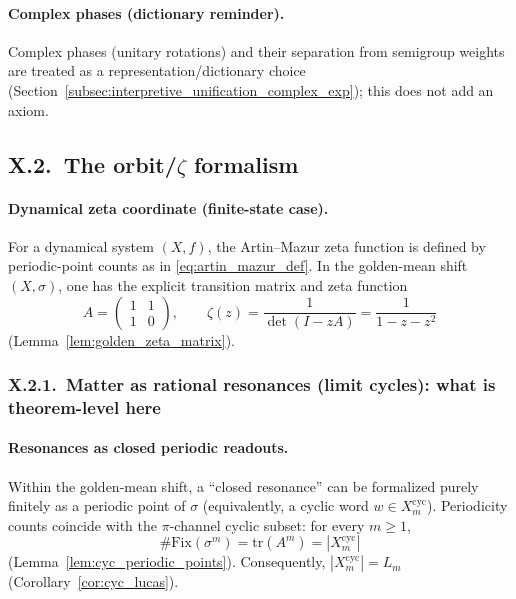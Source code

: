 \paragraph{Complex phases (dictionary reminder).}
\InterfaceTag Complex phases (unitary rotations) and their separation from semigroup weights are treated as a representation/dictionary choice (Section~\ref{subsec:interpretive_unification_complex_exp}); this does not add an axiom.

\subsection{X.2.\ The orbit/\texorpdfstring{$\zeta$}{zeta} formalism}
\label{subsec:x2_orbit_zeta_formalism}

\paragraph{Dynamical zeta coordinate (finite-state case).}
\MathTag For a dynamical system $(X,f)$, the Artin--Mazur zeta function is defined by periodic-point counts as in \eqref{eq:artin_mazur_def}.
In the golden-mean shift $(X,\sigma)$, one has the explicit transition matrix and zeta function
\[
A=\begin{pmatrix}1 & 1\\ 1 & 0\end{pmatrix},
\qquad
\zeta(z)=\frac{1}{\det(I-zA)}=\frac{1}{1-z-z^2}
\]
(Lemma~\ref{lem:golden_zeta_matrix}).

\subsubsection{X.2.1.\ Matter as rational resonances (limit cycles): what is theorem-level here}
\label{subsubsec:x21_matter_as_resonances}

\paragraph{Resonances as closed periodic readouts.}
\MathTag Within the golden-mean shift, a ``closed resonance'' can be formalized purely finitely as a periodic point of $\sigma$ (equivalently, a cyclic word $w\in X_m^{\mathrm{cyc}}$).
Periodicity counts coincide with the $\pi$-channel cyclic subset: for every $m\ge 1$,
\[
\#\mathrm{Fix}(\sigma^m)=\mathrm{tr}(A^m)=|X_m^{\mathrm{cyc}}|
\]
(Lemma~\ref{lem:cyc_periodic_points}).
Consequently, $|X_m^{\mathrm{cyc}}|=L_m$ (Corollary~\ref{cor:cyc_lucas}).


